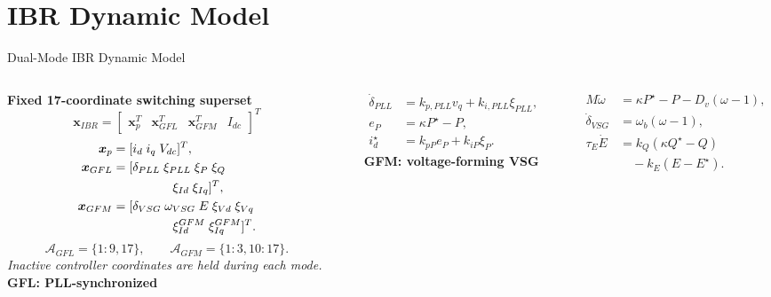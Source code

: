 \documentclass{beamer}
\begin{document}
\section{IBR Dynamic Model}
\begin{frame}{Dual-Mode IBR Dynamic Model}
\begin{columns}[t,onlytextwidth]
\scriptsize
\textbf{Fixed 17-coordinate switching superset}
\[
\bm{x}_{IBR}=\begin{bmatrix}
\bm{x}_{p}^{T}&\bm{x}_{GFL}^{T}&\bm{x}_{GFM}^{T}&I_{dc}
\end{bmatrix}^{T}
\]
\begin{align*}
\bm{x}_{p}&=[i_d\;i_q\;V_{dc}]^T,\\
\bm{x}_{GFL}&=[\delta_{PLL}\;\xi_{PLL}\;\xi_P\;\xi_Q\\
&\hspace{1.7cm}\xi_{Id}\;\xi_{Iq}]^T,\\
\bm{x}_{GFM}&=[\delta_{VSG}\;\omega_{VSG}\;E\;\xi_{Vd}\;\xi_{Vq}\\
&\hspace{1.7cm}\xi_{Id}^{GFM}\;\xi_{Iq}^{GFM}]^T.
\end{align*}
\[
\mathcal{A}_{GFL}=\{1{:}9,17\},\qquad
\mathcal{A}_{GFM}=\{1{:}3,10{:}17\}.
\]
\textit{Inactive controller coordinates are held during each mode.}
\scriptsize
{\color{myblue}\textbf{GFL: PLL-synchronized}}\\[-0.15em]
\rule{\linewidth}{0.35pt}
\begin{align*}
\dot\delta_{PLL}&=k_{p,PLL}v_q+k_{i,PLL}\xi_{PLL},\\
e_P&=\kappa P^\star-P,\\
i_d^\star&=k_{pP}e_P+k_{iP}\xi_P.
\end{align*}
\vspace{0.25cm}
{\color{myblue}\textbf{GFM: voltage-forming VSG}}\\[-0.15em]
\rule{\linewidth}{0.35pt}
\begin{align*}
M\dot\omega&=\kappa P^\star-P-D_v(\omega-1),\\
\dot\delta_{VSG}&=\omega_b(\omega-1),\\
\tau_E\dot E&=k_Q(\kappa Q^\star-Q)\\
&\quad-k_E(E-E^\star).
\end{align*}
\end{columns}
\end{frame}
\end{document}
